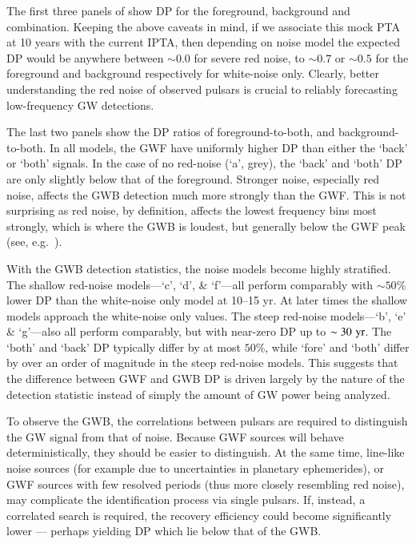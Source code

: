 \documentclass[useAMS, usenatbib]{mnras}  %
\begin{document}
        The first three panels of  show DP for the foreground, background and combination.  Keeping the above caveats in mind, if we associate this mock PTA at 10 years with the current IPTA, then depending on noise model the expected DP would be anywhere between $\sim 0.0$ for severe red noise, to $\sim 0.7$ or $\sim 0.5$ for the foreground and background respectively for white-noise only.  Clearly, better understanding the red noise of observed pulsars is crucial to reliably forecasting low-frequency GW detections.

        The last two panels show the DP ratios of foreground-to-both, and background-to-both.  In all models, the GWF have uniformly higher DP than either the `back' or `both' signals.  In the case of no red-noise (`a', grey), the `back' and `both' DP are only slightly below that of the foreground.  Stronger noise, especially red noise, affects the GWB detection much more strongly than the GWF.  This is not surprising as red noise, by definition, affects the lowest frequency bins most strongly, which is where the GWB is loudest, but generally below the GWF peak (see, e.g.~).

        With the GWB detection statistics, the noise models become highly stratified.  The shallow red-noise models---`c', `d', \& `f'---all perform comparably with $\sim 50\%$ lower DP than the white-noise only model at 10--15 yr.  At later times the shallow models approach the white-noise only values.  The steep red-noise models---`b', `e' \& `g'---also all perform comparably, but with near-zero DP up to $\sim 30 \, \,\mathrm{yr}$.  The `both' and `back' DP typically differ by at most $50\%$, while `fore' and `both' differ by over an order of magnitude in the steep red-noise models.  This suggests that the difference between GWF and GWB DP is driven largely by the nature of the detection statistic instead of simply the amount of GW power being analyzed.

        To observe the GWB, the correlations between pulsars are required to distinguish the GW signal from that of noise.  Because GWF sources will behave deterministically, they should be easier to distinguish.  At the same time, line-like noise sources (for example due to uncertainties in planetary ephemerides), or GWF sources with few resolved periods (thus more closely resembling red noise), may complicate the identification process via single pulsars.  If, instead, a correlated search is required, the recovery efficiency could become significantly lower --- perhaps yielding DP which lie below that of the GWB.
\end{document}
